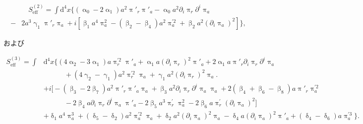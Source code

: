 \documentclass[a4paper,11pt]{ltjsarticle}
\numberwithin{equation}{section}
\newcommand{\dd}{\mathrm{d}}
\begin{document}
\begin{align}
&\quad S_{\mathrm{eff}}^{(2)} = \int \dd^4 x \Big\{\left( \upalpha_0 -2 \upalpha_1\right) a^2 \uppi'_{r} \uppi'_{a} - \upalpha_0 a^2 \partial_i \uppi_{r}  \partial^i \uppi_{a}   \\
-& 2 a^3 \upgamma_1 \uppi'_{r} \uppi_a + i \left[\upbeta_1 a^4 \uppi_a^2 - \left(\upbeta_2 - \upbeta_4\right) a^2\uppi_a^{\prime2} + \upbeta_2 a^2 \left(\partial_i \uppi_{a} \right)^2\right] \Big\}, \nonumber
\end{align}

および

\begin{align}
S_{\mathrm{eff}}^{(3)} =  \int &\dd^4 x \Big\{\left(4 \upalpha_2 -3\upalpha_1 \right) a \uppi_r^{\prime2} \uppi'_{a} + \upalpha_1 a \left(\partial_i \uppi_{r} \right)^2 \uppi'_a + 2 \upalpha_1 a \uppi'_{r}	\partial_i \uppi_{r}  \partial^i \uppi_{a} \\
& \qquad \quad + \left(4 \upgamma_2 -\upgamma_1 \right)  a^2\uppi_r^{\prime2} \uppi_{a}	+ \upgamma_1 a^2	\left(\partial_i \uppi_{r} \right)^2 \uppi_a \nonumber \Big. \\
&+ i \Big[-(\upbeta_3-2\upbeta_7) a^2 \uppi'_{r} \uppi'_{a} \uppi_a + \upbeta_3 a^2 \partial_i \uppi_{r}  \partial^i \uppi_{a} \uppi_a +2 (\upbeta_4+\upbeta_6 - \upbeta_8) a \uppi'_{r} \uppi_a^{\prime2} \nonumber \\
& \qquad \quad - 2 \upbeta_4  a \partial_i \uppi_{r}  \partial^i \uppi_{a} \uppi'_{a} - 2\upbeta_5 a^3 \uppi_r^{\prime} \uppi_a^2  - 2 \upbeta_6 a \uppi_r^{\prime} (\partial_i\uppi_a)^2 \Big] \nonumber\\
&+\updelta_1 a^4 \uppi_a^3 + (\updelta_5- \updelta_2) a^2 \uppi_a^{\prime2} \uppi_a  + \updelta_2 a^2 (\partial_i \uppi_{a})^2 \uppi_a - \updelta_4 a  (\partial_i \uppi_{a})^2 \uppi'_a + (\updelta_4-\updelta_6) a \uppi_a^{\prime3} \Big\}. \nonumber
\end{align}
\end{document}
